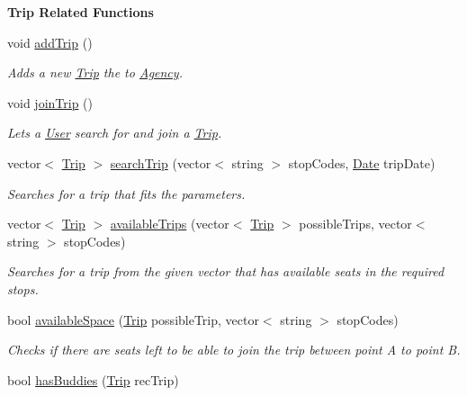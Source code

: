 \begin{Indent}\textbf{ Trip Related Functions}\par
\begin{DoxyCompactItemize}
\item 
void \hyperlink{group___agency_gaa0c7d82673ce6b573ccc46da3289634c}{add\+Trip} ()
\begin{DoxyCompactList}\small\item\em Adds a new \hyperlink{class_trip}{Trip} the to \hyperlink{class_agency}{Agency}. \end{DoxyCompactList}\item 
void \hyperlink{group___agency_gae2599882efc55adb7f295aeec65520d6}{join\+Trip} ()
\begin{DoxyCompactList}\small\item\em Lets a \hyperlink{class_user}{User} search for and join a \hyperlink{class_trip}{Trip}. \end{DoxyCompactList}\item 
vector$<$ \hyperlink{class_trip}{Trip} $>$ \hyperlink{group___agency_ga7ec6b058801f49850148979c1a41554a}{search\+Trip} (vector$<$ string $>$ stop\+Codes, \hyperlink{class_date}{Date} trip\+Date)
\begin{DoxyCompactList}\small\item\em Searches for a trip that fits the parameters. \end{DoxyCompactList}\item 
vector$<$ \hyperlink{class_trip}{Trip} $>$ \hyperlink{group___agency_ga892474fd8930e8e78e743e2b185b35ac}{available\+Trips} (vector$<$ \hyperlink{class_trip}{Trip} $>$ possible\+Trips, vector$<$ string $>$ stop\+Codes)
\begin{DoxyCompactList}\small\item\em Searches for a trip from the given vector that has available seats in the required stops. \end{DoxyCompactList}\item 
bool \hyperlink{group___agency_ga9defb73f53ce32bc6382843dd46fc464}{available\+Space} (\hyperlink{class_trip}{Trip} possible\+Trip, vector$<$ string $>$ stop\+Codes)
\begin{DoxyCompactList}\small\item\em Checks if there are seats left to be able to join the trip between point A to point B. \end{DoxyCompactList}\item 
bool \hyperlink{group___agency_gaa7fe817661a5e46322db9e809ac54fe9}{has\+Buddies} (\hyperlink{class_trip}{Trip} rec\+Trip)

\end{DoxyCompactItemize}
\end{Indent}
